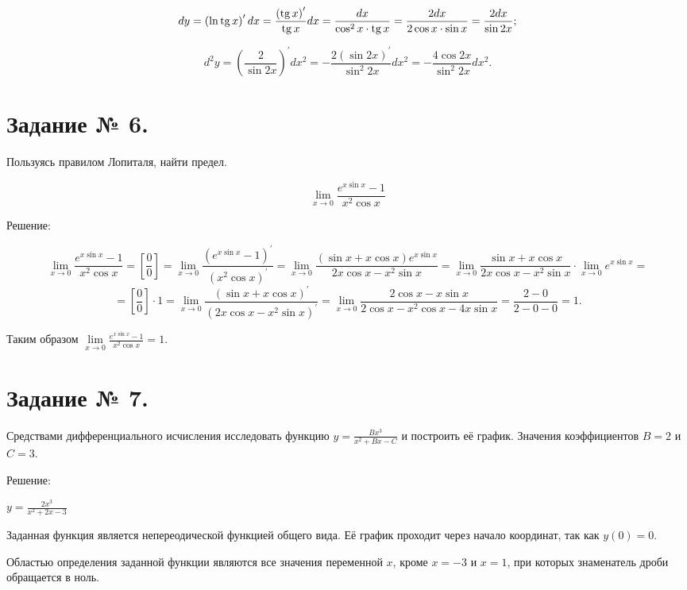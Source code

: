 \documentclass[fleqn]{article}
\newcommand{\tg}{\mathop{\rm tg}\nolimits}
\begin{document}
$$dy=\left(\ln{\tg{x}}\right)^\prime dx=\frac{\left(\tg{x}\right)^\prime}{\tg{x}}dx=\frac{dx}{\cos^2{x}\cdot\tg{x}}=\frac{2dx}{2\cos{x}\cdot\sin{x}}=\frac{2dx}{\sin{2x}};$$

$$d^2y=\left(\frac{2}{\sin{2x}}\right)^\prime dx^2=-\frac{2\left(\sin{2x}\right)^\prime}{\sin^2{2x}}dx^2=-\frac{4\cos{2x}}{\sin^2{2x}}dx^2.$$

\section*{Задание № 6.}

Пользуясь правилом Лопиталя, найти предел.

$$\lim_{x\to0}\frac{e^{x\sin{x}}-1}{x^2\cos{x}}$$

\begin{center}Решение:\end{center}

$$\lim_{x\to0}\frac{e^{x\sin{x}}-1}{x^2\cos{x}}=\left[\frac{0}{0}\right]=\lim_{x\to0}\frac{\left(e^{x\sin{x}}-1\right)^\prime}{\left(x^2\cos{x}\right)^\prime}=\lim_{x\to0}\frac{(\sin{x}+x\cos{x})e^{x\sin{x}}}{2x\cos{x}-x^2\sin{x}}=\lim_{x\to0}\frac{\sin{x}+x\cos{x}}{2x\cos{x}-x^2\sin{x}}\cdot\lim_{x\to0}e^{x\sin{x}}=$$
$$=\left[\frac{0}{0}\right]\cdot1=\lim_{x\to0}\frac{\left(\sin{x}+x\cos{x}\right)^\prime}{\left(2x\cos{x}-x^2\sin{x}\right)^\prime}=\lim_{x\to0}\frac{2\cos{x}-x\sin{x}}{2\cos{x}-x^2\cos{x}-4x\sin{x}}=\frac{2-0}{2-0-0}=1.$$

Таким образом $\lim\limits_{x\to0}\frac{e^{x\sin{x}}-1}{x^2\cos{x}}=1$.

\section*{Задание № 7.}

Средствами дифференциального исчисления исследовать функцию $y=\frac{Bx^3}{x^2+Bx-C}$ и построить её график. Значения коэффициентов $B=2$ и $C=3$.

\begin{center}Решение:\end{center}

$y=\frac{2x^3}{x^2+2x-3}$

Заданная функция является непереодической функцией общего вида. Её график проходит через начало координат, так как $y(0)=0$.

Областью определения заданной функции являются все значения переменной $x$, кроме $x=-3$ и $x=1$, при которых знаменатель дроби обращается в ноль.
\end{document}
